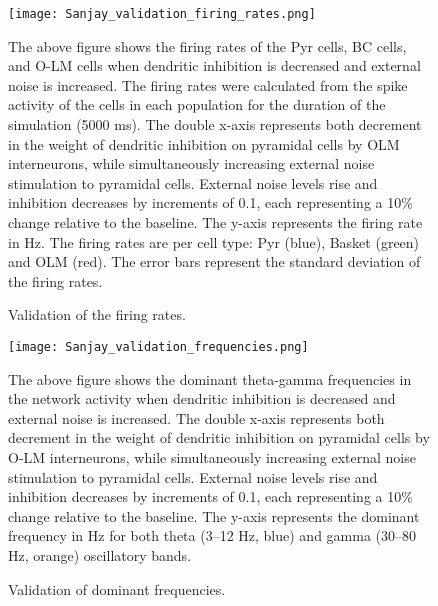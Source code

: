 \begin{figure}[htbp]
    \centering
    \texttt{[image: Sanjay\_validation\_firing\_rates.png]}
    \caption[Validation of the firing rates]{Validation of the firing rates.}\label{fig:validation_firing_rates}
    \begin{minipage}{0.9\textwidth}
        The above figure shows the firing rates of the Pyr cells, BC cells, and O-LM cells when dendritic inhibition is decreased and external noise is increased.
        The firing rates were calculated from the spike activity of the cells in each population for the duration of the simulation (5000 ms).
        The double x-axis represents both decrement in the weight of dendritic inhibition on pyramidal cells by OLM interneurons,
        while simultaneously increasing external noise stimulation to pyramidal cells.
        External noise levels rise and inhibition decreases by increments of 0.1, each representing a 10\% change relative to the baseline.
        The y-axis represents the firing rate in Hz.
        The firing rates are per cell type: Pyr (blue), Basket (green) and OLM (red).
        The error bars represent the standard deviation of the firing rates.
    \end{minipage}
\end{figure}

\begin{figure}[htbp]
    \centering
    \texttt{[image: Sanjay\_validation\_frequencies.png]}
    \caption[Validation of the firing rates]{Validation of dominant frequencies.}\label{fig:validation_frequencies}
    \begin{minipage}{0.9\textwidth}
        The above figure shows the dominant theta-gamma frequencies in the network activity when dendritic inhibition is decreased and external noise is increased.
        The double x-axis represents both decrement in the weight of dendritic inhibition on pyramidal cells by O-LM interneurons,
        while simultaneously increasing external noise stimulation to pyramidal cells.
        External noise levels rise and inhibition decreases by increments of 0.1, each representing a 10\% change relative to the baseline.
        The y-axis represents the dominant frequency in Hz for both theta (3--12 Hz, blue) and gamma (30--80 Hz, orange) oscillatory bands.
    \end{minipage}
\end{figure}


